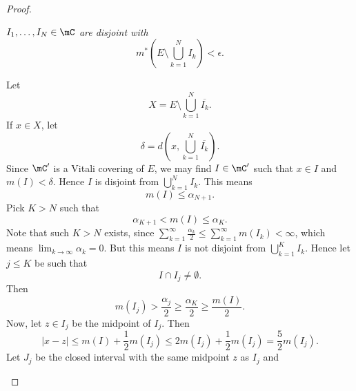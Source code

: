 \documentclass[pmath451]{subfiles}
\begin{document}
\begin{proof}
        \begin{claim}
            \textit{$I_1,\ldots,I_N\in\mC$ are disjoint with
            \begin{equation*}
                m^{*}\left( E\setminus\bigcup^{N}_{k=1}I_k \right)<\epsilon.
            \end{equation*}
            }

            Let
            \begin{equation*}
                X = E\setminus\bigcup^{N}_{k=1} \overline{I_k}.
            \end{equation*}
            If $x\in X$, let
            \begin{equation*}
                \delta = d\left( x,\bigcup^{N}_{k=1}\overline{I_k} \right).
            \end{equation*}
            Since $\mC'$ is a Vitali covering of $E$, we may find $I\in\mC'$ such that $x\in I$ and $m\left( I \right)<\delta$. Hence $I$ is disjoint from $\bigcup^{N}_{k=1}I_k$. This means
            \begin{equation*}
                m\left( I \right) \leq \alpha_{N+1}.
            \end{equation*}
            Pick $K>N$ such that
            \begin{equation*}
                \alpha_{K+1}<m\left( I \right) \leq \alpha_K.
            \end{equation*}
            Note that such $K>N$ exists, since $\sum^{\infty}_{k=1} \frac{\alpha_k}{2} \leq \sum^{\infty}_{k=1} m\left( I_k \right) < \infty$, which means $\lim_{k\to\infty}\alpha_k = 0$. But this means $I$ is not disjoint from $\bigcup^{K}_{k=1}I_k$. Hence let $j\leq K$ be such that
            \begin{equation*}
                I\cap I_j\neq\emptyset.
            \end{equation*}
            Then
            \begin{equation*}
                m\left( I_j \right) > \frac{\alpha_j}{2} \geq \frac{\alpha_K}{2} \geq \frac{m\left( I \right)}{2}.
            \end{equation*}
            Now, let $z\in I_j$ be the midpoint of $I_j$. Then
            \begin{equation*}
                \left| x-z \right| \leq m\left( I \right) + \frac{1}{2}m\left( I_j \right) \leq 2m\left( I_j \right) + \frac{1}{2}m\left( I_j \right) = \frac{5}{2}m\left( I_j \right).
            \end{equation*}
            Let $J_j$ be the closed interval with the same midpoint $z$ as $I_j$ and

\end{claim}
\end{proof}
\end{document}
